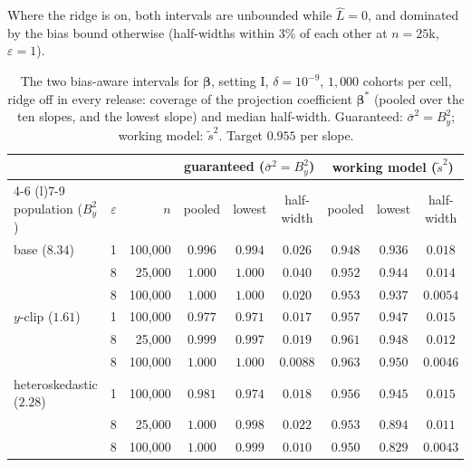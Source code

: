 \documentclass[11pt]{article}
\theoremstyle{definition}
\theoremstyle{plain}
\newcommand{\bbeta}{\boldsymbol{\beta}}
\begin{document}
Where the ridge is on, both intervals are unbounded while $\hat L = 0$, and dominated by the bias bound otherwise (half-widths within $3\%$ of each other at $n = 25$k, $\varepsilon = 1$).

\begin{table}[ht]
  \centering\small
  \caption{The two bias-aware intervals for $\bbeta$, setting I, $\delta = 10^{-9}$, $1{,}000$ cohorts per cell, ridge off in every release: coverage of the projection coefficient $\bbeta^\ast$ (pooled over the ten slopes, and the lowest slope) and median half-width. Guaranteed: $\bar\sigma^2 = B_y^2$; working model: $\tilde s^2$. Target $0.955$ per slope.}
  \label{tab:sigmabar}
  \footnotesize
  \setlength{\tabcolsep}{3pt}
  \begin{tabular}{@{}lrrcccccc@{}}
    \toprule
    & & & \multicolumn{3}{c}{guaranteed ($\bar\sigma^2 = B_y^2$)} & \multicolumn{3}{c}{working model ($\tilde s^2$)} \\
    \cmidrule(lr){4-6} \cmidrule(l){7-9}
    population ($B_y^2$) & $\varepsilon$ & $n$ & pooled & lowest & half-width & pooled & lowest & half-width \\
    \midrule
    base ($8.34$) & 1 & 100{,}000 & $0.996$ & $0.994$ & $0.026$ & $0.948$ & $0.936$ & $0.018$ \\
     & 8 & 25{,}000 & $1.000$ & $1.000$ & $0.040$ & $0.952$ & $0.944$ & $0.014$ \\
     & 8 & 100{,}000 & $1.000$ & $1.000$ & $0.020$ & $0.953$ & $0.937$ & $0.0054$ \\
    \addlinespace
    $y$-clip ($1.61$) & 1 & 100{,}000 & $0.977$ & $0.971$ & $0.017$ & $0.957$ & $0.947$ & $0.015$ \\
     & 8 & 25{,}000 & $0.999$ & $0.997$ & $0.019$ & $0.961$ & $0.948$ & $0.012$ \\
     & 8 & 100{,}000 & $1.000$ & $1.000$ & $0.0088$ & $0.963$ & $0.950$ & $0.0046$ \\
    \addlinespace
    heteroskedastic ($2.28$) & 1 & 100{,}000 & $0.981$ & $0.974$ & $0.018$ & $0.956$ & $0.945$ & $0.015$ \\
     & 8 & 25{,}000 & $1.000$ & $0.998$ & $0.022$ & $0.953$ & $0.894$ & $0.011$ \\
     & 8 & 100{,}000 & $1.000$ & $0.999$ & $0.010$ & $0.950$ & $0.829$ & $0.0043$ \\
    \bottomrule
  \end{tabular}
\end{table}
\end{document}
